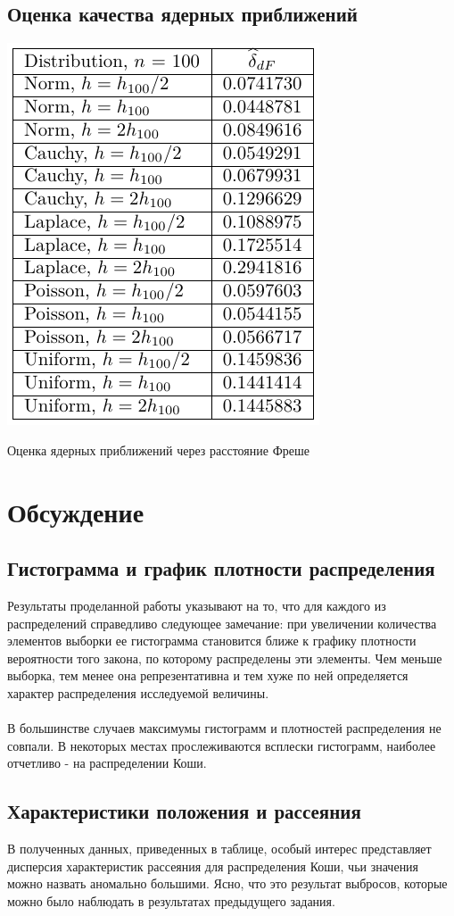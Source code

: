 \documentclass[a4paper]{article}
\begin{document}
\subsection{Оценка качества ядерных приближений}
\begin{table}[H]
    \centering
    \includegraphics[]{RNotebooks/frechetTests.pdf}
    \caption{Оценка ядерных приближений через расстояние Фреше}
    \label{tab:frechet}
\end{table}
\section{Обсуждение}
\subsection{Гистограмма и график плотности распределения}
Результаты проделанной работы указывают на то, что для каждого из распределений справедливо следующее замечание: при увеличении количества элементов выборки ее гистограмма становится ближе к графику плотности вероятности того закона, по которому распределены эти элементы. Чем меньше выборка, тем менее она репрезентативна и тем хуже по ней определяется характер распределения исследуемой величины.\\
\\
В большинстве случаев максимумы гистограмм и плотностей распределения не совпали. В некоторых местах прослеживаются всплески гистограмм, наиболее отчетливо - на распределении Коши.
\subsection{Характеристики положения и рассеяния}
В полученных данных, приведенных в таблице, особый интерес представляет дисперсия характеристик рассеяния для распределения Коши, чьи значения можно назвать аномально большими. Ясно, что это результат выбросов, которые можно было наблюдать в результатах предыдущего задания.
\end{document}
